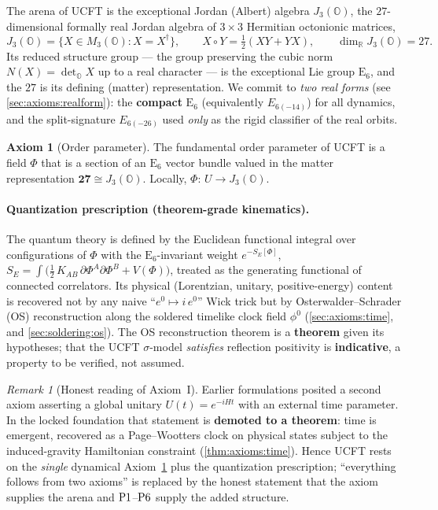 \documentclass[11pt]{article}
\theoremstyle{plain}
\theoremstyle{definition}
\newtheorem{axiom}[theorem]{Axiom}
\theoremstyle{remark}
\newtheorem{remark}[theorem]{Remark}
\newcommand{\E}[1]{\mathrm{E}_{#1}}
\newcommand{\Oct}{\mathbb{O}}
\newcommand{\jalg}{J_3(\mathbb{O})}
\newcommand{\ESix}{\E{6}}
\newcommand{\Rep}[1]{\mathbf{#1}}
\newcommand{\Pone}{\textnormal{P1}}
\newcommand{\Psix}{\textnormal{P6}}
\newcommand{\clock}{\phi^{0}}
\begin{document}
The arena of UCFT is the exceptional Jordan (Albert) algebra
$\jalg$, the $27$-dimensional formally real Jordan algebra of
$3\times3$ Hermitian octonionic matrices,
\[
  \jalg=\bigl\{X\in M_3(\Oct): X=X^{\dagger}\bigr\},
  \qquad X\circ Y=\tfrac12(XY+YX),
  \qquad \dim_{\mathbb R}\jalg=27 .
\]
Its reduced structure group --- the group preserving the cubic norm
$N(X)=\det_{\Oct}X$ up to a real character --- is the exceptional Lie group
$\ESix$, and the $27$ is its defining (matter) representation. We commit to
\emph{two real forms} (see \autoref{sec:axioms:realform}): the
\textbf{compact} $\ESix$ (equivalently $E_{6(-14)}$) for all dynamics, and
the split-signature $E_{6(-26)}$ used \emph{only} as the rigid classifier of
the real orbits.

\begin{axiom}[Order parameter]\label{ax:axioms:I}
The fundamental order parameter of UCFT is a field $\Phi$ that is a section
of an $\ESix$ vector bundle valued in the matter representation
$\Rep{27}\cong\jalg$. Locally, $\Phi:\,U\to\jalg$.
\end{axiom}

\paragraph{Quantization prescription (theorem-grade kinematics).}
The quantum theory is defined by the Euclidean functional integral over
configurations of $\Phi$ with the $\ESix$-invariant weight $e^{-S_E[\Phi]}$,
$S_E=\int\!\bigl(\tfrac12\,K_{\!AB}\,\partial\Phi^A\partial\Phi^B+V(\Phi)\bigr)$,
treated as the generating functional of connected correlators. Its physical
(Lorentzian, unitary, positive-energy) content is recovered not by any naive
``$e^0\mapsto i\,e^0$'' Wick trick but by Osterwalder--Schrader (OS)
reconstruction along the soldered timelike clock field $\clock$
(\autoref{sec:axioms:time}, and \autoref{sec:soldering:os}). The OS
reconstruction theorem is a \textbf{theorem} given its hypotheses; that the
UCFT $\sigma$-model \emph{satisfies} reflection positivity is
\textbf{indicative}, a property to be verified, not assumed.

\begin{remark}[Honest reading of Axiom~I]\label{rem:axioms:honest}
Earlier formulations posited a second axiom asserting a global unitary
$U(t)=e^{-iHt}$ with an external time parameter. In the locked foundation
that statement is \textbf{demoted to a theorem}: time is emergent, recovered
as a Page--Wootters clock on physical states subject to the induced-gravity
Hamiltonian constraint (\autoref{thm:axioms:time}). Hence UCFT rests on the
\emph{single} dynamical Axiom~\ref{ax:axioms:I} plus the quantization
prescription; ``everything follows from two axioms'' is replaced by the
honest statement that the axiom supplies the arena and $\Pone$--$\Psix$
supply the added structure.
\end{remark}
\end{document}
